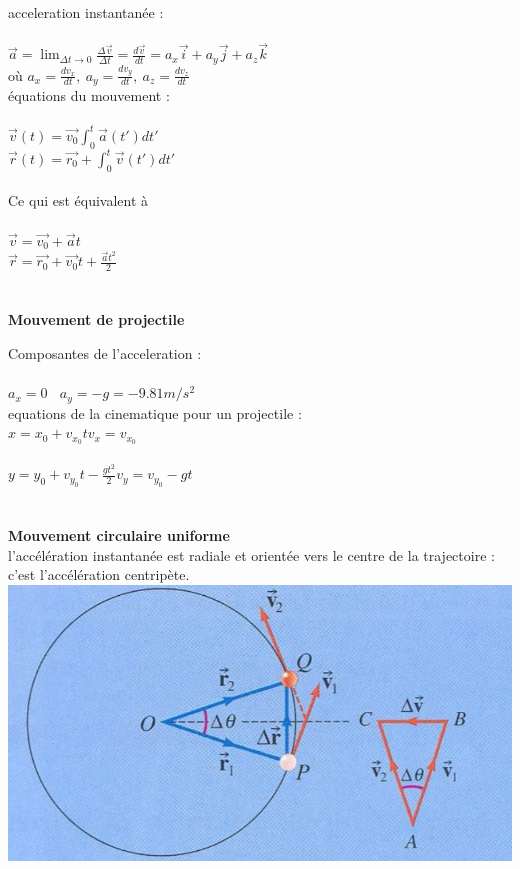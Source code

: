 \documentclass[]{article}
\begin{document}
acceleration instantanée :\\\\
\indent \indent $\overrightarrow{a} = \displaystyle \lim_{\Delta t \to 0}\frac{\Delta \overrightarrow{v}}{\Delta t} = \frac{d\overrightarrow{v}}{dt} = a_x\overrightarrow{i} + a_y \overrightarrow{j} + a_z \overrightarrow{k}$\\
\indent \indent où $a_x = \frac{dv_x}{dt},~a_y = \frac{dv_y}{dt},~a_z = \frac{dv_z}{dt}$\\

équations du mouvement :\\\\
\indent \indent $\overrightarrow{v}(t) = \overrightarrow{v_0}\displaystyle \int^t_0 \overrightarrow{a}(t')dt'$\\
\indent \indent $\overrightarrow{r}(t) =  \overrightarrow{r_0} + \displaystyle \int^t_0 \overrightarrow{v}(t')dt'$\\\\

Ce qui est équivalent à\\\\
\indent \indent $\overrightarrow{v} = \overrightarrow{v_0} + \overrightarrow{a}t$\\
\indent \indent $\overrightarrow{r} = \overrightarrow{r_0} + \overrightarrow{v_0}t + \frac{\overrightarrow{a}t^2}{2}$\\\\\\
\textbf{Mouvement de projectile}

Composantes de l'acceleration : \\\\
\indent \indent $a_x = 0~~~~ a_y = -g = -9.81m/s^2$\\

equations de la cinematique pour un projectile :\\
\indent \indent $x = x_0 + v_{x_0}t$\indent \indent \indent$v_x = v_{x_0}$\\\\
\indent \indent $y = y_0 + v_{y_0}t-\frac{gt^2}{2}$\indent$v_y = v_{y_0}-gt$\\\\\\
\newpage
\noindent \textbf{Mouvement circulaire uniforme}\\
l'accélération instantanée est radiale et orientée vers le centre de la trajectoire : c'est l'accélération centripète.\\
\includegraphics[scale=0.65]{MCU}\\
\end{document}
